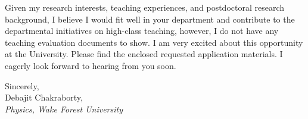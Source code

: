 \documentclass{portfolio}
\begin{document}
\ifTeaching{
%
}


Given my research interests, teaching experiences, and postdoctoral research background, I believe I would
fit well in your department and contribute to the departmental initiatives on  high-class teaching, however, I do not have any teaching evaluation documents to show.  I am very excited about this opportunity at the University. Please find the enclosed
requested application materials. I eagerly look forward to hearing from you soon.


Sincerely, \\
Debajit Chakraborty,\\
\textit{Physics, Wake Forest University}
\end{document}
